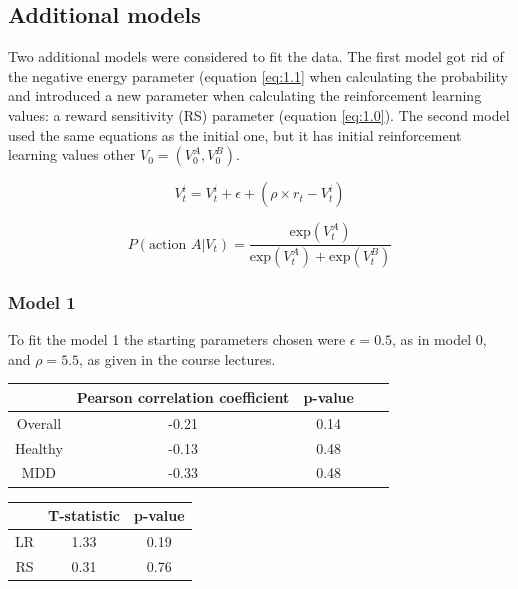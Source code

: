 \documentclass[12pt]{article}
\begin{document}
\subsection{Additional models}

Two additional models were considered to fit the data. The first model got rid of the negative energy parameter (equation \ref{eq:1.1} when calculating the probability and introduced a new parameter when calculating the reinforcement learning values: a reward sensitivity (RS) parameter (equation \ref{eq:1.0}). The second model used the same equations as the initial one, but it has initial reinforcement learning values other $V_0 = (V^A_0, V^B_0)$. 

\begin{equation}
    V_t^i = V_t^i + \epsilon + (\rho \times r_t - V_t^i)
    \label{eq:1.0}
\end{equation}

\begin{equation}
    P(\text{action } A | V_t) = \frac{\mathrm{exp}(V_t^A)}{\mathrm{exp}(V_t^A) + \mathrm{exp}(V_t^B)}
    \label{eq:1.1}
\end{equation}

\subsubsection{Model 1}

To fit the model 1 the starting parameters chosen were $\epsilon=0.5$, as in model 0, and $\rho=5.5$, as given in the course lectures.

\begin{center}
 \begin{tabular}{|c || c | c | c| c |} 
 \hline
  & Pearson correlation coefficient & p-value  \\ [0.5ex] 
 \hline\hline
 Overall & -0.21 & 0.14  \\ 
 \hline
 Healthy & -0.13 & 0.48 \\
 \hline
 MDD & -0.33 & 0.48 \\ [1ex] 
 \hline
\end{tabular}
\end{center}

\begin{center}
 \begin{tabular}{|c || c | c |} 
 \hline
  & T-statistic & p-value  \\ [0.5ex] 
 \hline\hline
 LR & 1.33 & 0.19 \\
 \hline
 RS & 0.31 & 0.76 \\ [1ex] 
 \hline
\end{tabular}
\end{center}
\end{document}
